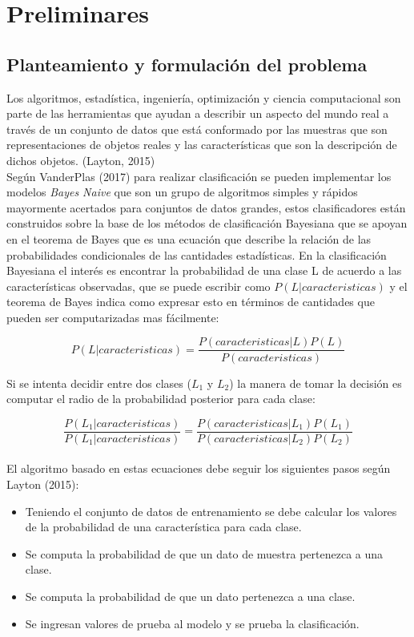 \chapter{Preliminares}

\section{Planteamiento y formulaci\'on del problema}

Los algoritmos, estadística, ingeniería, optimización y ciencia computacional son parte de las herramientas que ayudan a describir un aspecto del mundo real a través de un conjunto de datos que está conformado por las muestras que son representaciones de objetos reales y las características que son la descripción de dichos objetos. (Layton, 2015)\\

Según VanderPlas (2017) para realizar clasificación se pueden implementar los modelos \textit{Bayes Naive} que son un grupo de algoritmos simples y rápidos mayormente acertados para conjuntos de datos grandes, estos clasificadores están construidos sobre la base de los métodos de clasificación Bayesiana que se apoyan en el teorema de Bayes que es una ecuación que describe la relación de las probabilidades condicionales de las cantidades estadísticas. En la clasificación Bayesiana el interés es encontrar la probabilidad de una clase L de acuerdo a las características observadas, que se puede escribir como $P\left(L|caracteristicas\right)$ y el teorema de Bayes indica como expresar esto en términos de cantidades que pueden ser computarizadas mas fácilmente:

\[P\left(L|caracteristicas\right)=\frac{P\left(caracteristicas|L\right)P\left(L\right)}{P\left(caracteristicas\right)}\]

Si se intenta decidir entre dos clases ($L_{1}$ y $L_{2}$) la manera de tomar la decisión es computar el radio de la probabilidad posterior para cada clase:

\[\frac{P\left(L_{1}|caracteristicas\right)}{P\left(L_{1}|caracteristicas\right)}=\frac{P\left(caracteristicas|L_{1}\right)P\left(L_{1}\right)}{P\left(caracteristicas|L_{2}\right)P\left(L_{2}\right)}\]\\

El algoritmo basado en estas ecuaciones debe seguir los siguientes pasos según Layton (2015):

\begin{itemize}
	\item Teniendo el conjunto de datos de entrenamiento se debe calcular los valores de la probabilidad de una característica para cada clase.
	\item Se computa la probabilidad de que un dato de muestra pertenezca a una clase.
	\item Se computa la probabilidad de que un dato pertenezca a una clase.
	\item Se ingresan valores de prueba al modelo y se prueba la clasificación.
\end{itemize}

